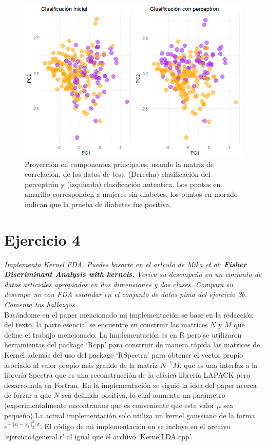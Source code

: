 \documentclass[paper=letter, fontsize=11pt]{scrartcl}
\numberwithin{equation}{section} %
\numberwithin{figure}{section} %
\numberwithin{table}{section} %
\begin{document}
\begin{enumerate}
\begin{figure}[H]
  \begin{center}
    \includegraphics[scale=.65]{pima.png}
    \caption{ Proyección en componentes principales, usando la matriz de correlacion, de los datos de test. (Derecha) clasificación del perceptrón y (izquierda) clasificación autentica. Los puntos en amarillo corresponden a mujeres sin diabetes, los puntos en morado indican que la prueba de diabetes fue positiva.}
    \label{figura3_2}
  \end{center}
\end{figure}
\FloatBarrier

\end{enumerate}


\section{Ejercicio 4}
\textit{Implementa Kernel FDA. Puedes basarte en el artculo de Mika et al: \textbf{Fisher Discriminant Analysis with kernels}. Verica su desempeño en un conjunto de datos articiales apropiados en dos dimensiones y dos clases. Compara su desempe~no con FDA estandar en el conjunto de datos pima del ejercicio 3b. Comenta tus hallazgos.}\\

Basándome en el paper mencionado mi implementación se base en la redacción del texto, la parte esencial se encuentre en construir las matrices $N$ y $M$ que define el trabajo mencionado. La implementación es en R pero se utilizaron herramientas del package ‘Rcpp’ para construir de manera rápida las matrices de Kernel además del uso del package ‘RSpectra’ para obtener el vector propio asociado al valor propio más grande de la matriz $N^{-1}M$, que es una interfaz a la librería Spectra que es una reconstrucción de la clásica librería LAPACK pero desarrollada en Fortran. En la implementación se siguió la idea del paper acerca de forzar a que $N$ sea definida positiva, lo cual aumenta un parámetro (experimentalmente encontramos que es conveniente que este valor $\mu$ sea pequeño).La actual implementación solo utiliza un kernel gaussiano de la forma $e^{-||x_i-x_j||^2_2/\sigma}$. El código de mi implementación en se incluye en el archivo ‘ejercicio4general.r’ al igual que el archivo ‘KernelLDA.cpp’.\\
\end{document}
